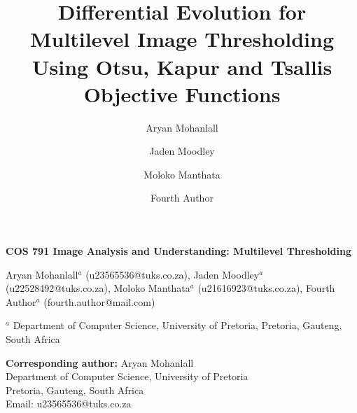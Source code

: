 \documentclass[review]{elsarticle}
\begin{document}
\begin{frontmatter}




\begin{titlepage}
\begin{center}

\vspace*{1cm}

\textbf{\large COS 791 Image Analysis and Understanding: Multilevel Thresholding}

\vspace{1.5cm}

Aryan Mohanlall$^{a}$ (u23565536@tuks.co.za),
Jaden Moodley$^{a}$ (u22528492@tuks.co.za),
Moloko Manthata$^{a}$ (u21616923@tuks.co.za),
Fourth Author$^{a}$ (fourth.author@mail.com) \\

\vspace{0.5cm}

\begin{flushleft}
\small
$^a$ Department of Computer Science, University of Pretoria,
Pretoria, Gauteng, South Africa

\vspace{1cm}

\textbf{Corresponding author:} Aryan Mohanlall \\
Department of Computer Science, University of Pretoria \\
Pretoria, Gauteng, South Africa \\
Email: u23565536@tuks.co.za

\end{flushleft}

\end{center}
\end{titlepage}





\title{Differential Evolution for Multilevel Image Thresholding Using Otsu, Kapur and Tsallis Objective Functions}

\author[label1]{Aryan Mohanlall }

\author[label1]{Jaden Moodley}

\author[label1]{Moloko Manthata}

\author[label1]{Fourth Author}



\end{frontmatter}
\end{document}
